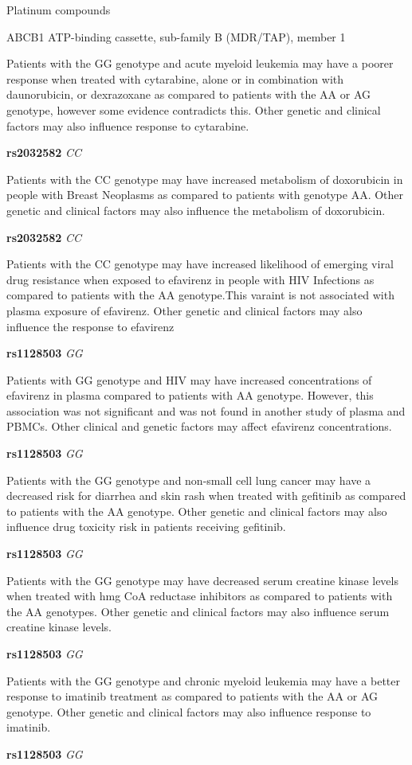 \documentclass{resume} %
\begin{document}
\begin{rSection}{ Platinum compounds }
\begin{rSubsection}{ ABCB1 }{ ATP-binding cassette, sub-family B (MDR/TAP), member 1 }{}{}
\item[] Patients with the GG genotype and acute myeloid leukemia may have a poorer response when treated with cytarabine, alone or in combination with daunorubicin, or dexrazoxane as compared to patients with the AA or AG genotype, however some evidence contradicts this. Other genetic and clinical factors may also influence response to cytarabine.\item \textbf{ rs2032582 } \textit{ CC }
\item[] Patients with the  CC genotype may have increased metabolism of doxorubicin in people with Breast Neoplasms as compared to patients with genotype AA. Other genetic and clinical factors may also influence the metabolism of doxorubicin.\item \textbf{ rs2032582 } \textit{ CC }
\item[] Patients with the CC genotype may have increased likelihood of emerging viral drug resistance when exposed to efavirenz in people with HIV Infections as compared to patients with the AA genotype.This varaint is not associated with plasma exposure of efavirenz. Other genetic and clinical factors may also influence the response to efavirenz\item \textbf{ rs1128503 } \textit{ GG }
\item[] Patients with GG genotype and HIV may have increased concentrations of efavirenz in plasma compared to patients with AA genotype. However, this association was not significant and was not found in another study of plasma and PBMCs.  Other clinical and genetic factors may affect efavirenz concentrations.\item \textbf{ rs1128503 } \textit{ GG }
\item[] Patients with the GG genotype and non-small cell lung cancer may have a decreased risk for diarrhea and skin rash when treated with gefitinib as compared to patients with the AA genotype. Other genetic and clinical factors may also influence drug toxicity risk in patients receiving gefitinib.\item \textbf{ rs1128503 } \textit{ GG }
\item[] Patients with the GG genotype may have decreased serum creatine kinase levels when treated with hmg CoA reductase inhibitors as compared to patients with the AA genotypes. Other genetic and clinical factors may also influence serum creatine kinase levels. \item \textbf{ rs1128503 } \textit{ GG }
\item[] Patients with the GG genotype and chronic myeloid leukemia may have a better response to imatinib treatment as compared to patients with the AA or AG genotype. Other genetic and clinical factors may also influence response to imatinib. \item \textbf{ rs1128503 } \textit{ GG }

\end{rSubsection}
\end{rSection}
\end{document}
